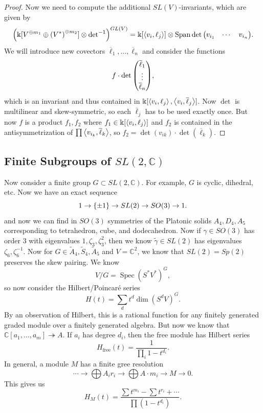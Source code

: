 \documentclass[leqno, openany]{memoir}
\theoremstyle{definition}
\theoremstyle{remark}
\theoremstyle{plain}
\theoremstyle{definition}
\theoremstyle{remark}
\newcommand{\C}{\mathbb{C}}
\renewcommand{\k}{\Bbbk}
\newcommand{\mr}[1]{\mathrm{#1}}
\newcommand{\ol}[1]{\overline{#1}}
\newcommand{\wtl}[1]{\widetilde{#1}}
\DeclareMathOperator{\Spec}{Spec}
\begin{document}
\begin{proof}
    Now we need to compute the additional $SL(V)$-invariants, which are given by
    \[ {\qty( \k[V^{\oplus m_1} \oplus {(V^*)}^{\oplus m_2}] \otimes {\det}^{-1} )}^{GL(V)} = \k[\ev{v_i, \ell_j}] \otimes \operatorname{Span} \det \mqty(v_{i_1} & \cdots & v_{i_n}). \]
    We will introduce new covectors $\ol{\ell}_1, \ldots, \ol{\ell}_n$ and consider the functions
    \[ f \cdot \det \mqty(\ol{\ell}_1 \\ \vdots \\ \ol{\ell}_n), \]
    which is an invariant and thus contained in $\k[\ev{v_i, \ell_j}, \ev{v_i, \ol{\ell}_j}]$. Now $\det$ is multilinear and skew-symmetric, so each $\ol{\ell}_j$ has to be used exactly once. But now $f$ is a product $f_1, f_2$ where $f_1 \in \k[\ev{v_i, \ell_j}]$ and $f_2$ is contained in the antisymmetrization of $\prod \ev{v_{i_k}, \ol{\ell}_k}$, so $f_2 = \det (v_{ik}) \cdot \det (\ol{\ell}_k)$.
\end{proof}

\subsection{Finite Subgroups of $SL(2, \C)$}%
\label{sub:finite_subgroups_of_sl_2_c_}



Now consider a finite group $G \subset SL(2, \C)$. For example, $G$ is cyclic, dihedral, etc. Now we have an exact sequence
\[ 1 \to \qty{\pm 1} \to SL(2) \to SO(3) \to 1. \]
and now we can find in $SO(3)$ symmetries of the Platonic solids $A_4, D_4, A_5$ corresponding to tetrahedron, cube, and dodecahedron. Now if $\gamma \in SO(3)$ has order $3$ with eigenvalues $1, \zeta_3, \zeta_3^2$, then we know $\wtl{\gamma} \in SL(2)$ has eigenvalues $\zeta_6, \zeta_6^{-1}$. Now for $G \in \wtl{A}_4, \wtl{S}_4, \wtl{A}_5$ and $V = \C^2$, we know that $SL(2) = Sp(2)$ preserves the skew pairing. We know
\[ V/G = \Spec { ( S^* V^* ) }^G, \]
so now consider the Hilbert/Poincar\'e series
\[ H(t) = \sum_d t^d \dim {(S^d V)}^G. \]
By an observation of Hilbert, this is a rational function for any finitely generated graded module over a finitely generated algebra. But now we know that $\C[a_1, \ldots, a_m] \twoheadrightarrow A$. If $a_i$ has degree $d_i$, then the free module has Hilbert series
\[ H_{\mr{free}}(t) = \frac{1}{\prod_i 1 - t^{d_i}}. \]
In general, a module $M$ has a finite gree resolution
\[ \cdots \to \bigoplus A_i r_i \to \bigoplus A \cdot m_i \to M \to 0. \]
This gives us
\[ H_M(t) = \frac{\sum t^{m_i} - \sum t^{r_i} + \cdots}{\prod (1-t^{d_i})}. \]
\end{document}
